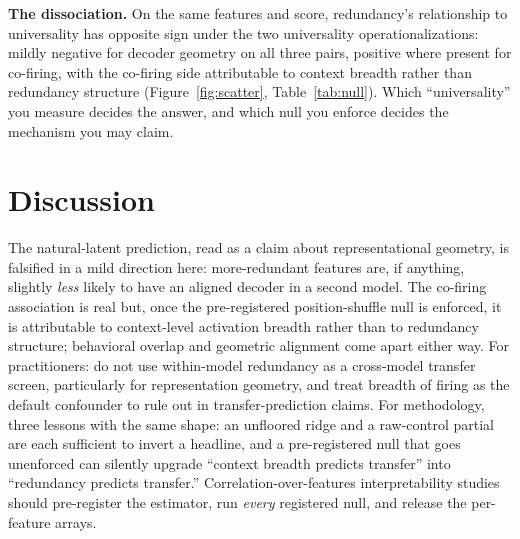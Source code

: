 \documentclass[11pt]{article}
\begin{document}
\textbf{The dissociation.} On the same features and score, redundancy's relationship to universality has
opposite sign under the two universality operationalizations: mildly negative for decoder geometry on all
three pairs, positive where present for co-firing, with the co-firing side attributable to context
breadth rather than redundancy structure (Figure~\ref{fig:scatter}, Table~\ref{tab:null}). Which
``universality'' you measure decides the answer, and which null you enforce decides the mechanism you may
claim.

\section{Discussion}
\label{sec:discussion}
The natural-latent prediction, read as a claim about representational geometry, is falsified in a mild
direction here: more-redundant features are, if anything, slightly \emph{less} likely to have an aligned
decoder in a second model. The co-firing association is real but, once the pre-registered
position-shuffle null is enforced, it is attributable to context-level activation breadth rather than to
redundancy structure; behavioral overlap and geometric alignment come apart either way. For
practitioners: do not use within-model redundancy as a cross-model transfer screen, particularly for
representation geometry, and treat breadth of firing as the default confounder to rule out in
transfer-prediction claims. For methodology, three lessons with the same shape: an unfloored ridge and a
raw-control partial are each sufficient to invert a headline, and a pre-registered null that goes
unenforced can silently upgrade ``context breadth predicts transfer'' into ``redundancy predicts
transfer.'' Correlation-over-features interpretability studies should pre-register the estimator, run
\emph{every} registered null, and release the per-feature arrays.
\end{document}
